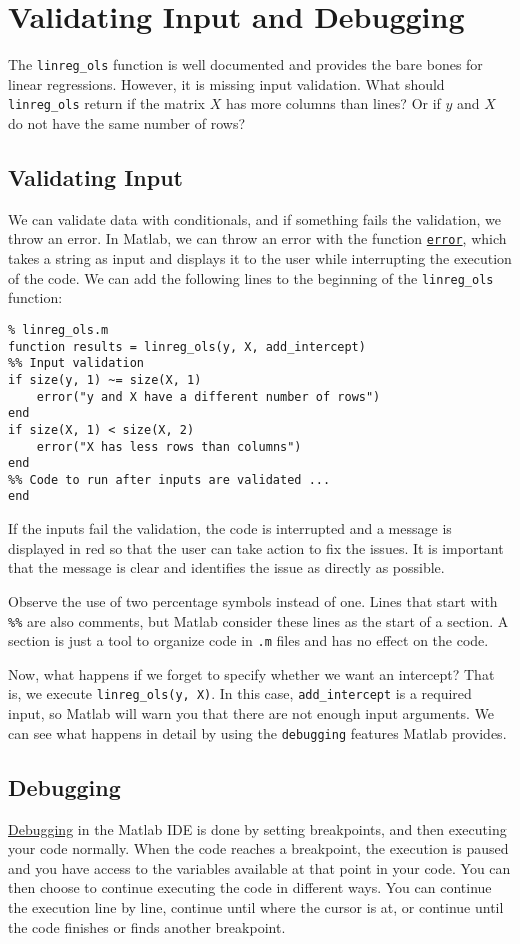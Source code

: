 \documentclass[12pt, a4paper]{article}
\begin{document}
\section{Validating Input and Debugging}
\label{sec:orgf32519d}
The \texttt{linreg\_ols} function is well documented and provides the bare bones for linear regressions.
However, it is missing input validation.
What should \texttt{linreg\_ols} return if the matrix \(X\) has more columns than lines?
Or if \(y\) and \(X\) do not have the same number of rows?
\subsection{Validating Input}
\label{sec:org535d91b}
We can validate data with conditionals, and if something fails the validation, we throw an error.
In Matlab, we can throw an error with the function \href{https://www.mathworks.com/help/matlab/ref/error.html}{\texttt{error}}, which takes a string as input and displays it to the user while interrupting the execution of the code.
We can add the following lines to the beginning of the \texttt{linreg\_ols} function:
\lstset{language=matlab,label= ,caption= ,captionpos=b,firstnumber=1,numbers=left,style=Matlab-editor}
\begin{lstlisting}
% linreg_ols.m
function results = linreg_ols(y, X, add_intercept)
%% Input validation
if size(y, 1) ~= size(X, 1)
    error("y and X have a different number of rows")
end
if size(X, 1) < size(X, 2)
    error("X has less rows than columns")
end
%% Code to run after inputs are validated ...
end
\end{lstlisting}
If the inputs fail the validation, the code is interrupted and a message is displayed in red so that the user can take action to fix the issues.
It is important that the message is clear and identifies the issue as directly as possible.

Observe the use of two percentage symbols instead of one.
Lines that start with \texttt{\%\%} are also comments, but Matlab consider these lines as the start of a section.
A section is just a tool to organize code in \texttt{.m} files and has no effect on the code.

Now, what happens if we forget to specify whether we want an intercept?
That is, we execute \texttt{linreg\_ols(y, X)}.
In this case, \texttt{add\_intercept} is a required input, so Matlab will warn you that there are not enough input arguments.
We can see what happens in detail by using the \texttt{debugging} features Matlab provides.
\subsection{Debugging}
\label{sec:org7d74e88}
\href{https://www.mathworks.com/help/matlab/matlab\_prog/debugging-process-and-features.html}{Debugging} in the Matlab IDE is done by setting breakpoints, and then executing your code normally.
When the code reaches a breakpoint, the execution is paused and you have access to the variables available at that point in your code.
You can then choose to continue executing the code in different ways.
You can continue the execution line by line, continue until where the cursor is at, or continue until the code finishes or finds another breakpoint.
\end{document}
